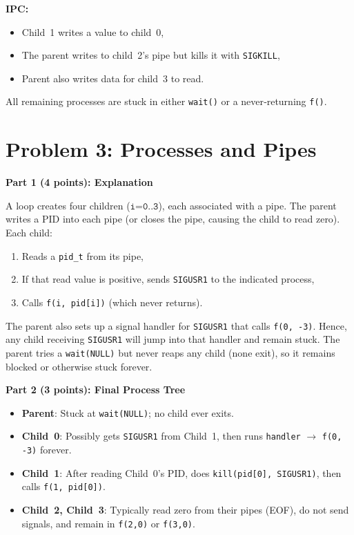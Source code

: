 \documentclass[11pt]{article}
\begin{document}
	\noindent
	\textbf{IPC:} 
	\begin{itemize}
		\item Child~1 writes a value to child~0, 
		\item The parent writes to child~2’s pipe but kills it with \texttt{SIGKILL},
		\item Parent also writes data for child~3 to read.
	\end{itemize}
	All remaining processes are stuck in either \texttt{wait()} or a never‐returning \texttt{f()}.
	
	
	\bigskip
	
	\section*{Problem 3: Processes and Pipes}
	
	\noindent
	\textbf{Part 1 (4 points): Explanation}
	
	A loop creates four children (\(\texttt{i=0..3}\)), each associated with a pipe.  The parent writes a PID into each pipe (or closes the pipe, causing the child to read zero).  Each child:
	\begin{enumerate}
		\item Reads a \texttt{pid\_t} from its pipe,
		\item If that read value is positive, sends \texttt{SIGUSR1} to the indicated process,
		\item Calls \texttt{f(i, pid[i])} (which never returns).
	\end{enumerate}
	The parent also sets up a signal handler for \texttt{SIGUSR1} that calls \texttt{f(0, -3)}.  Hence, any child receiving \texttt{SIGUSR1} will jump into that handler and remain stuck.  The parent tries a \texttt{wait(NULL)} but never reaps any child (none exit), so it remains blocked or otherwise stuck forever.
	
	\medskip
	
	\noindent
	\textbf{Part 2 (3 points): Final Process Tree}
	
	\begin{itemize}
		\item \textbf{Parent}: Stuck at \texttt{wait(NULL)}; no child ever exits.
		\item \textbf{Child~0}: Possibly gets \texttt{SIGUSR1} from Child~1, then runs \texttt{handler} $\rightarrow$ \texttt{f(0, -3)} forever.
		\item \textbf{Child~1}: After reading Child~0’s PID, does \texttt{kill(pid[0], SIGUSR1)}, then calls \texttt{f(1, pid[0])}.
		\item \textbf{Child~2, Child~3}: Typically read zero from their pipes (EOF), do not send signals, and remain in \texttt{f(2,0)} or \texttt{f(3,0)}.
	\end{itemize}
	
\end{document}
